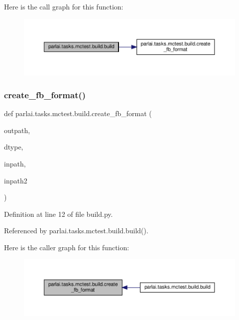 Here is the call graph for this function\+:
\nopagebreak
\begin{figure}[H]
\begin{center}
\leavevmode
\includegraphics[width=350pt]{namespaceparlai_1_1tasks_1_1mctest_1_1build_aed15e288ff3209606d79f5cbfee86b5a_cgraph}
\end{center}
\end{figure}
\mbox{\label{namespaceparlai_1_1tasks_1_1mctest_1_1build_a7d827f19f83b7d60f4ed1dbabade06cf}} 
\subsubsection{\texorpdfstring{create\+\_\+fb\+\_\+format()}{create\_fb\_format()}}
{\footnotesize\ttfamily def parlai.\+tasks.\+mctest.\+build.\+create\+\_\+fb\+\_\+format (\begin{DoxyParamCaption}\item[{}]{outpath,  }\item[{}]{dtype,  }\item[{}]{inpath,  }\item[{}]{inpath2 }\end{DoxyParamCaption})}



Definition at line 12 of file build.\+py.



Referenced by parlai.\+tasks.\+mctest.\+build.\+build().

Here is the caller graph for this function\+:
\nopagebreak
\begin{figure}[H]
\begin{center}
\leavevmode
\includegraphics[width=350pt]{namespaceparlai_1_1tasks_1_1mctest_1_1build_a7d827f19f83b7d60f4ed1dbabade06cf_icgraph}
\end{center}
\end{figure}
